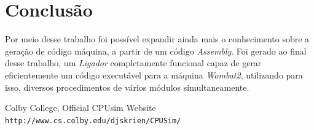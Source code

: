 \documentclass{article}
\begin{document}
\goodbreak\newpage\section{Conclusão}

Por meio desse trabalho foi possível expandir ainda mais o conhecimento sobre a geração de código máquina, a partir de um código \textit{Assembly}. Foi gerado ao final desse trabalho, um \textit{Ligador} completamente funcional capaz de gerar eficientemente um código executável para a máquina \textit{Wombat2}, utilizando para isso, diversos procedimentos de vários módulos simultaneamente.


\begin{thebibliography}{9}

Colby College, Official CPUsim Website
\\\texttt{http://www.cs.colby.edu/djskrien/CPUSim/}
\end{thebibliography}
\end{document}
